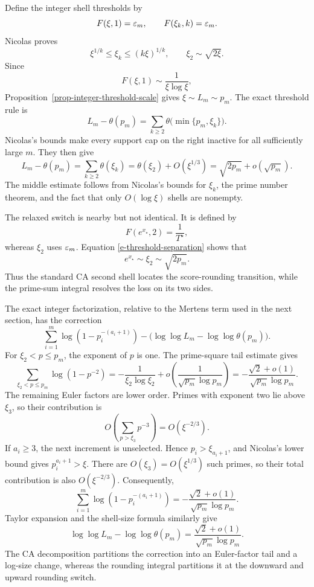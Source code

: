 Define the integer shell thresholds by
\[
    F(\xi,1)=\varepsilon_m,
    \qquad
    F(\xi_k,k)=\varepsilon_m.
\]
Nicolas \cite[Proposition~4.7]{nicolas-2022-sigma} proves
\[
    \xi^{1/k}\leq\xi_k\leq(k\xi)^{1/k},
    \qquad
    \xi_2\sim\sqrt{2\xi}.
\]
Since
\[
    F(\xi,1)\sim\frac1{\xi\log\xi},
\]
Proposition~\ref{prop-integer-threshold-scale} gives
\(\xi\sim L_m\sim p_m\). The exact threshold rule is
\[
    L_m-\theta(p_m)
    =
    \sum_{k\geq2}\theta\bigl(\min\{p_m,\xi_k\}\bigr).
\]
Nicolas's bounds make every support cap on the right inactive for all
sufficiently large \(m\). They then give
\[
    L_m-\theta(p_m)
    =
    \sum_{k\geq2}\theta(\xi_k)
    =
    \theta(\xi_2)+O(\xi^{1/3})
    =
    \sqrt{2p_m}+o(\sqrt{p_m}).
\]
The middle estimate follows from Nicolas's bounds for \(\xi_k\), the
prime number theorem, and the fact that only \(O(\log\xi)\) shells are
nonempty.

The relaxed switch is nearby but not identical. It is defined by
\[
    F(e^{x_\star},2)=\frac1{T^\star},
\]
whereas \(\xi_2\) uses \(\varepsilon_m\). Equation
\eqref{e-threshold-separation} shows that
\[
    e^{x_\star}\sim\xi_2\sim\sqrt{2p_m}.
\]
Thus the standard CA second shell locates the score-rounding
transition, while the prime-sum integral resolves the loss on its two
sides.

The exact integer factorization, relative to the Mertens term used in
the next section, has the correction
\[
    \sum_{i=1}^m\log(1-p_i^{-(a_i+1)})
    -\bigl(\log\log L_m-\log\log\theta(p_m)\bigr).
\]
For \(\xi_2<p\leq p_m\), the exponent of \(p\) is one. The prime-square
tail estimate \cite[equations~(2.10)--(2.11)]{nicolas-2022-sigma} gives
\[
    \sum_{\xi_2<p\leq p_m}\log(1-p^{-2})
    =
    -\frac1{\xi_2\log\xi_2}
    +o\left(\frac1{\sqrt{p_m}\log p_m}\right)
    =
    -\frac{\sqrt2+o(1)}{\sqrt{p_m}\log p_m}.
\]
The remaining Euler factors are lower order. Primes with exponent two
lie above \(\xi_3\), so their contribution is
\[
    O\left(\sum_{p>\xi_3}p^{-3}\right)
    =
    O(\xi^{-2/3}).
\]
If \(a_i\geq3\), the next increment is unselected. Hence
\(p_i>\xi_{a_i+1}\), and Nicolas's lower bound gives
\(p_i^{a_i+1}>\xi\). There are \(O(\xi_3)=O(\xi^{1/3})\) such primes, so
their total contribution is also \(O(\xi^{-2/3})\). Consequently,
\[
    \sum_{i=1}^m\log(1-p_i^{-(a_i+1)})
    =
    -\frac{\sqrt2+o(1)}{\sqrt{p_m}\log p_m}.
\]
Taylor expansion and the shell-size formula similarly give
\[
    \log\log L_m-\log\log\theta(p_m)
    =
    \frac{\sqrt2+o(1)}{\sqrt{p_m}\log p_m}.
\]
The CA decomposition partitions the correction into an Euler-factor tail
and a log-size change, whereas the rounding integral partitions it at the
downward and upward rounding switch.

